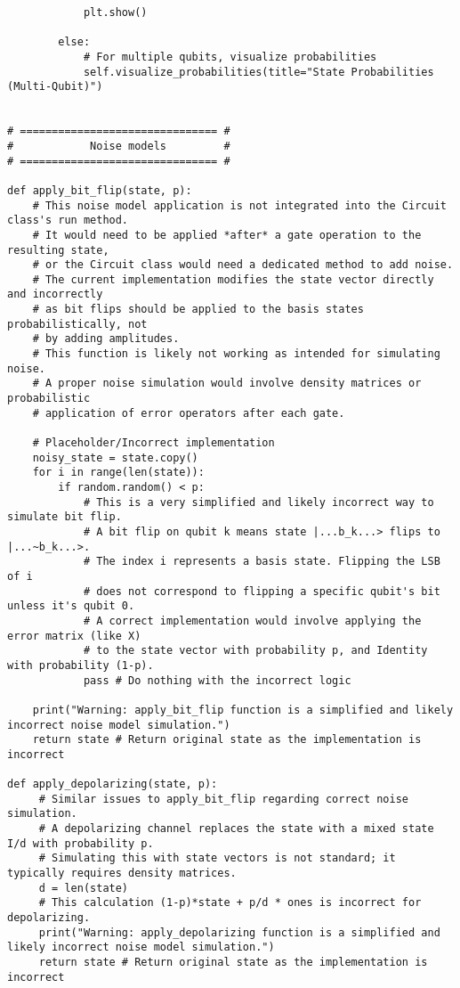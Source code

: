 \documentclass{beamer}
\begin{document}
\begin{frame}
\begin{verbatim}
            plt.show()

        else:
            # For multiple qubits, visualize probabilities
            self.visualize_probabilities(title="State Probabilities (Multi-Qubit)")


# =============================== #
#            Noise models         #
# =============================== #

def apply_bit_flip(state, p):
    # This noise model application is not integrated into the Circuit class's run method.
    # It would need to be applied *after* a gate operation to the resulting state,
    # or the Circuit class would need a dedicated method to add noise.
    # The current implementation modifies the state vector directly and incorrectly
    # as bit flips should be applied to the basis states probabilistically, not
    # by adding amplitudes.
    # This function is likely not working as intended for simulating noise.
    # A proper noise simulation would involve density matrices or probabilistic
    # application of error operators after each gate.

    # Placeholder/Incorrect implementation
    noisy_state = state.copy()
    for i in range(len(state)):
        if random.random() < p:
            # This is a very simplified and likely incorrect way to simulate bit flip.
            # A bit flip on qubit k means state |...b_k...> flips to |...~b_k...>.
            # The index i represents a basis state. Flipping the LSB of i
            # does not correspond to flipping a specific qubit's bit unless it's qubit 0.
            # A correct implementation would involve applying the error matrix (like X)
            # to the state vector with probability p, and Identity with probability (1-p).
            pass # Do nothing with the incorrect logic

    print("Warning: apply_bit_flip function is a simplified and likely incorrect noise model simulation.")
    return state # Return original state as the implementation is incorrect

def apply_depolarizing(state, p):
     # Similar issues to apply_bit_flip regarding correct noise simulation.
     # A depolarizing channel replaces the state with a mixed state I/d with probability p.
     # Simulating this with state vectors is not standard; it typically requires density matrices.
     d = len(state)
     # This calculation (1-p)*state + p/d * ones is incorrect for depolarizing.
     print("Warning: apply_depolarizing function is a simplified and likely incorrect noise model simulation.")
     return state # Return original state as the implementation is incorrect



\end{verbatim}
\end{frame}
\end{document}
